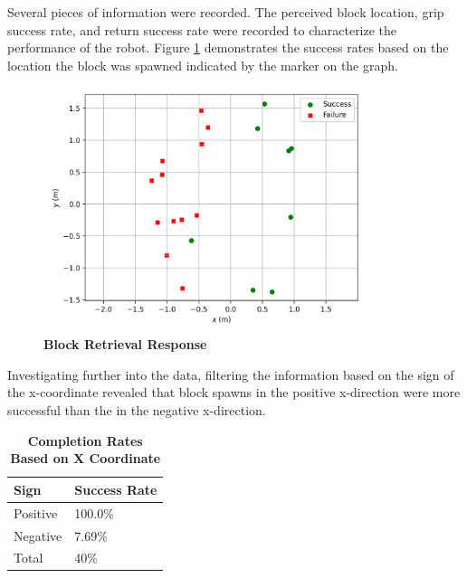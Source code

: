         Several pieces of information were recorded. The perceived block location, grip success rate, and return success rate were recorded to characterize the performance of the robot. Figure \ref{block_response} demonstrates the success rates based on the location the block was spawned indicated by the marker on the graph.
        
        \begin{figure}[htp]
        	\begin{center}
        	\includegraphics[width=0.85\textwidth]{pictures/Figure_1.png}
        	\caption{\textbf{Block Retrieval Response}}
        	\label{block_response}
        	\end{center}
        \end{figure}
        
        Investigating further into the data, filtering the information based on the sign of the x-coordinate revealed that block spawns in the positive x-direction were more successful than the in the negative x-direction. 
        
        \begin{table}[H]
            \begin{center}
            \caption{\textbf{Completion Rates Based on X Coordinate}}
            \label{table:completion}
            \begin{tabular}{|p{1.8in}|p{1.8in}|}
                \hline
                \textbf{Sign} & \textbf{Success Rate}\\ \hline
                 Positive & 100.0\%\\ \hline
                 Negative & 7.69\% \\ \hline
                 Total & 40\% \\ \hline
            \end{tabular}
            \end{center}
        \end{table}
        
